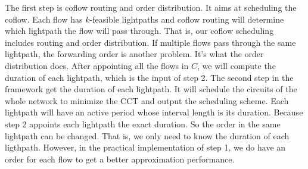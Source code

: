 The first step is coflow routing and order distribution. It aims at scheduling the coflow. Each flow has $k$-feasible lightpaths and coflow routing will determine which lightpath the flow will pass through. That is, our coflow scheduling includes routing and order distribution. If multiple flows pass through the same lightpath, the forwarding order is another problem. It's what the order distribution does. After appointing all the flows in $C$, we will compute the duration of each lightpath, which is the input of step 2. The second step in the framework get the duration of each lightpath. It will schedule the circuits of the whole network to minimize the CCT and output the scheduling scheme. Each lightpath will have an active period whose interval length is its duration. Because step 2 appoints each lightpath the exact duration. So the order in the same lightpath can be changed. That is, we only need to know the duration of each ligthpath. However, in the practical implementation of step 1, we do have an order for each flow to get a better approximation performance.


